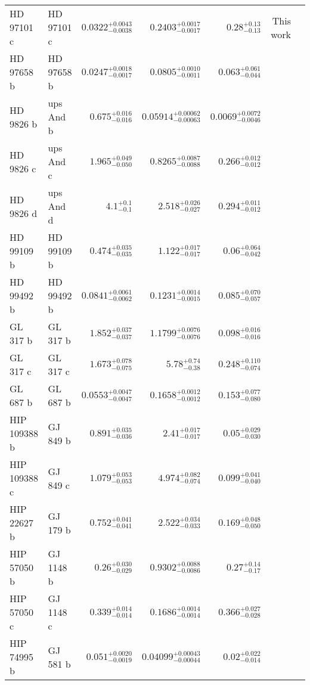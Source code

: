 \begin{longtable*}{llrrrrr}
HD 97101 c & HD 97101 c & $0.0322^{+0.0043}_{-0.0038}$ & $0.2403^{+0.0017}_{-0.0017}$ & $0.28^{+0.13}_{-0.13}$ & This work & \\
HD 97658 b & HD 97658 b & $0.0247^{+0.0018}_{-0.0017}$ & $0.0805^{+0.0010}_{-0.0011}$ & $0.063^{+0.061}_{-0.044}$ & \cite{Howard11} & \\
HD 9826 b & ups And b & $0.675^{+0.016}_{-0.016}$ & $0.05914^{+0.00062}_{-0.00063}$ & $0.0069^{+0.0072}_{-0.0046}$ & \cite{Butler97} & \\
HD 9826 c & ups And c & $1.965^{+0.049}_{-0.050}$ & $0.8265^{+0.0087}_{-0.0088}$ & $0.266^{+0.012}_{-0.012}$ & \cite{Naef04} & \\
HD 9826 d & ups And d & $4.1^{+0.1}_{-0.1}$ & $2.518^{+0.026}_{-0.027}$ & $0.294^{+0.011}_{-0.012}$ & \cite{Naef04} & \\
HD 99109 b & HD 99109 b & $0.474^{+0.035}_{-0.035}$ & $1.122^{+0.017}_{-0.017}$ & $0.06^{+0.064}_{-0.042}$ & \cite{Butler06} & \\
HD 99492 b & HD 99492 b & $0.0841^{+0.0061}_{-0.0062}$ & $0.1231^{+0.0014}_{-0.0015}$ & $0.085^{+0.070}_{-0.057}$ & \cite{Marcy05} & \\
GL 317 b & GL 317 b & $1.852^{+0.037}_{-0.037}$ & $1.1799^{+0.0076}_{-0.0076}$ & $0.098^{+0.016}_{-0.016}$ & \cite{Johnson07b} & \\
GL 317 c & GL 317 c & $1.673^{+0.078}_{-0.075}$ & $5.78^{+0.74}_{-0.38}$ & $0.248^{+0.110}_{-0.074}$ & \cite{Anglada-Escude12} & \\
GL 687 b & GL 687 b & $0.0553^{+0.0047}_{-0.0047}$ & $0.1658^{+0.0012}_{-0.0012}$ & $0.153^{+0.077}_{-0.080}$ & \cite{Burt14} & \\
HIP 109388 b & GJ 849 b & $0.891^{+0.035}_{-0.036}$ & $2.41^{+0.017}_{-0.017}$ & $0.05^{+0.029}_{-0.030}$ & \cite{Butler06_GJ849} & \\
HIP 109388 c & GJ 849 c & $1.079^{+0.053}_{-0.053}$ & $4.974^{+0.082}_{-0.074}$ & $0.099^{+0.041}_{-0.040}$ & \cite{Feng15} & \\
HIP 22627 b & GJ 179 b & $0.752^{+0.041}_{-0.041}$ & $2.522^{+0.034}_{-0.033}$ & $0.169^{+0.048}_{-0.050}$ & \cite{Howard10} & \\
HIP 57050 b & GJ 1148 b & $0.26^{+0.030}_{-0.029}$ & $0.9302^{+0.0088}_{-0.0086}$ & $0.27^{+0.14}_{-0.17}$ & \cite{Haghighipour10} & \\
HIP 57050 c & GJ 1148 c & $0.339^{+0.014}_{-0.014}$ & $0.1686^{+0.0014}_{-0.0014}$ & $0.366^{+0.027}_{-0.028}$ & \cite{Trifonov17} & \\
HIP 74995 b & GJ 581 b & $0.051^{+0.0020}_{-0.0019}$ & $0.04099^{+0.00043}_{-0.00044}$ & $0.02^{+0.022}_{-0.014}$ & \cite{Bonfils05} & \\

\end{longtable*}
